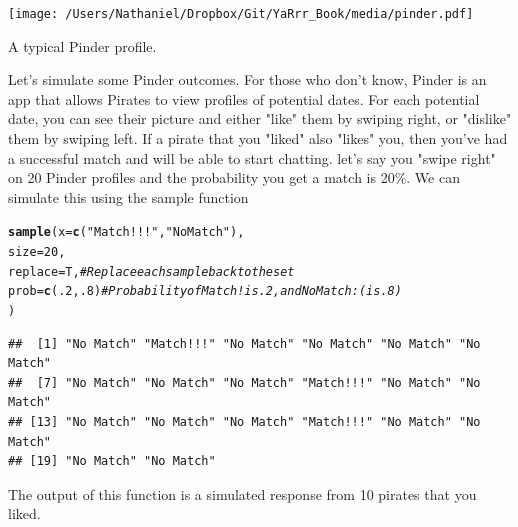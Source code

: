 \documentclass{tufte-book}\usepackage[]{graphicx}\usepackage[]{color}
\makeatletter
\newcommand{\hlnum}[1]{\textcolor[rgb]{0.686,0.059,0.569}{#1}}%
\newcommand{\hlstr}[1]{\textcolor[rgb]{0.192,0.494,0.8}{#1}}%
\newcommand{\hlcom}[1]{\textcolor[rgb]{0.678,0.584,0.686}{\textit{#1}}}%
\newcommand{\hlstd}[1]{\textcolor[rgb]{0.345,0.345,0.345}{#1}}%
\newcommand{\hlkwc}[1]{\textcolor[rgb]{0.333,0.667,0.333}{#1}}%
\newcommand{\hlkwd}[1]{\textcolor[rgb]{0.737,0.353,0.396}{\textbf{#1}}}%
\newenvironment{kframe}{%
 \def\at@end@of@kframe{}%
 \ifinner\ifhmode%
  \def\at@end@of@kframe{\end{minipage}}%
  \begin{minipage}{\columnwidth}%
 \fi\fi%
 \def\FrameCommand##1{\hskip\@totalleftmargin \hskip-\fboxsep
 \colorbox{shadecolor}{##1}\hskip-\fboxsep
     \hskip-\linewidth \hskip-\@totalleftmargin \hskip\columnwidth}%
 \MakeFramed {\advance\hsize-\width
   \@totalleftmargin\z@ \linewidth\hsize
   \@setminipage}}%
 {\par\unskip\endMakeFramed%
 \at@end@of@kframe}
\newenvironment{knitrout}{}{} %
\makeatother
\begin{document}
\begin{marginfigure}
\texttt{[image: /Users/Nathaniel/Dropbox/Git/YaRrr\_Book/media/pinder.pdf]}
\caption{A typical Pinder profile.}
\label{fig:pinder}
\end{marginfigure}


Let's simulate some Pinder outcomes. For those who don't know, Pinder is an app that allows Pirates to view profiles of potential dates. For each potential date, you can see their picture and either "like" them by swiping right, or "dislike" them by swiping left. If a pirate that you "liked" also "likes" you, then you've had a successful match and will be able to start chatting. let's say you "swipe right" on 20 Pinder profiles and the probability you get a match is 20\%. We can simulate this using the sample function

\begin{footnotesize}
\begin{knitrout}
\color{fgcolor}\begin{kframe}
\begin{alltt}
\hlkwd{sample}\hlstd{(}\hlkwc{x} \hlstd{=} \hlkwd{c}\hlstd{(}\hlstr{"Match!!!"}\hlstd{,} \hlstr{"No Match"}\hlstd{),}
       \hlkwc{size} \hlstd{=} \hlnum{20}\hlstd{,}
       \hlkwc{replace} \hlstd{= T,} \hlcom{# Replace each sample back to the set}
       \hlkwc{prob} \hlstd{=} \hlkwd{c}\hlstd{(}\hlnum{.2}\hlstd{,} \hlnum{.8}\hlstd{)}  \hlcom{# Probability of Match! is .2, and No Match :( is .8)}
       \hlstd{)}
\end{alltt}
\begin{verbatim}
##  [1] "No Match" "Match!!!" "No Match" "No Match" "No Match" "No Match"
##  [7] "No Match" "No Match" "No Match" "Match!!!" "No Match" "No Match"
## [13] "No Match" "No Match" "No Match" "Match!!!" "No Match" "No Match"
## [19] "No Match" "No Match"
\end{verbatim}
\end{kframe}
\end{knitrout}
\end{footnotesize}

The output of this function is a simulated response from 10 pirates that you liked. 

\end{document}

